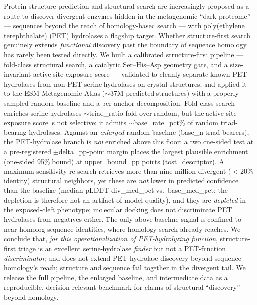 Protein structure prediction and structural search are increasingly proposed as a
route to discover divergent enzymes hidden in the metagenomic ``dark proteome'' ---
sequences beyond the reach of homology-based search --- with poly(ethylene
terephthalate) (PET) hydrolases a flagship target. Whether structure-first search
genuinely extends \emph{functional} discovery past the boundary of sequence homology
has rarely been tested directly. We built a calibrated structure-first pipeline ---
fold-class structural search, a catalytic Ser--His--Asp geometry gate, and a
size-invariant active-site-exposure score --- validated to cleanly separate known
PET hydrolases from non-PET serine hydrolases on crystal structures, and applied it
to the ESM Metagenomic Atlas ($\sim$37M predicted structures) with a properly
sampled random baseline and a per-anchor decomposition. Fold-class search enriches
serine hydrolases $\sim${{triad_ratio}}-fold over random, but the active-site-exposure
score is not selective: it admits $\sim${{base_rate_pct}}\% of random triad-bearing
hydrolases. Against an \emph{enlarged} random baseline ({{base_n}} triad-bearers),
the PET-hydrolase branch is \emph{not} enriched above this floor: a two one-sided
test at a pre-registered $\pm${{delta_pp}}-point margin places the largest plausible
enrichment (one-sided 95\% bound) at {{upper_bound_pp}} points
({{tost_descriptor}}). A maximum-sensitivity re-search retrieves more than nine
million divergent ($<$20\% identity) structural neighbors, yet these are \emph{not}
lower in predicted confidence than the baseline (median pLDDT {{div_med_pct}} vs.\
{{base_med_pct}}; the depletion is therefore not an artifact of model quality), and
they are \emph{depleted} in the exposed-cleft phenotype; molecular docking does not
discriminate PET hydrolases from negatives either. The only above-baseline signal is
confined to near-homolog sequence identities, where homology search already reaches.
We conclude that, \emph{for this operationalization of PET-hydrolyzing function},
structure-first triage is an excellent serine-hydrolase \emph{finder} but not a
PET-function \emph{discriminator}, and does not extend PET-hydrolase discovery beyond
sequence homology's reach; structure and sequence fail together in the divergent
tail. We release the full pipeline, the enlarged baseline, and intermediate data as a
reproducible, decision-relevant benchmark for claims of structural ``discovery''
beyond homology.


